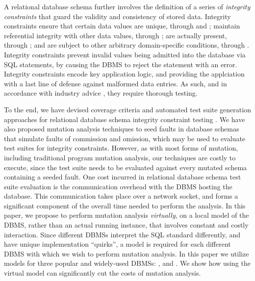 \begin{sloppypar}
A relational database schema further involves the definition of a series of {\it integrity constraints} that guard the validity and consistency of stored data. Integrity constraints ensure that certain data values are unique, through \PKCs and \UCs; maintain referential integrity with other data values, through \FKCs; are actually present, through \NNCs; and are subject to other arbitrary domain-specific conditions, through \CCs. Integrity constraints prevent invalid values being admitted into the database via SQL \INSERT statements, by causing the DBMS to reject the statement with an error. Integrity constraints encode key application logic, and providing the applciation with a last line of defense against malformed data entries. As such, and in accordance with industry advice \cite{DzoneDatabaseTesting}, they require thorough testing. 
\end{sloppypar}

To the end, we have devised coverage criteria and automated test suite generation approaches for relational database schema integrity constraint testing \cite{Kapfhammer2013,McMinn2015}. We have also proposed mutation analysis techniques to seed faults in database schemas that simulate faults of commission and omission, which may be used to evaluate test suites for integrity constraints. 
%
However, as with most forms of mutation, including traditional program mutation analysis, our techniques are costly to execute, since the test suite needs to be evaluated against every mutated schema containing a seeded fault. 
%
One cost incurred in relational database schema test suite evaluation is the communication overhead with the DBMS hosting the database. This communication takes place over a network socket, and forms a significant component of the overall time needed to perform the analysis. In this paper, we propose to perform mutation analysis {\it virtually}, on a local model of the DBMS, rather than an actual running instance, that involves constant and costly interaction. Since different DBMSs interpret the SQL standard differently, and have unique implementation ``quirks'', a model is required for each different DBMS with which we wish to perform mutation analysis. In this paper we utilize models for three popular and widely-used DBMSs: \HyperSQL, \Postgres and \SQLite. %
We show how using the virtual model can significantly cut the costs of mutation analysis. %

